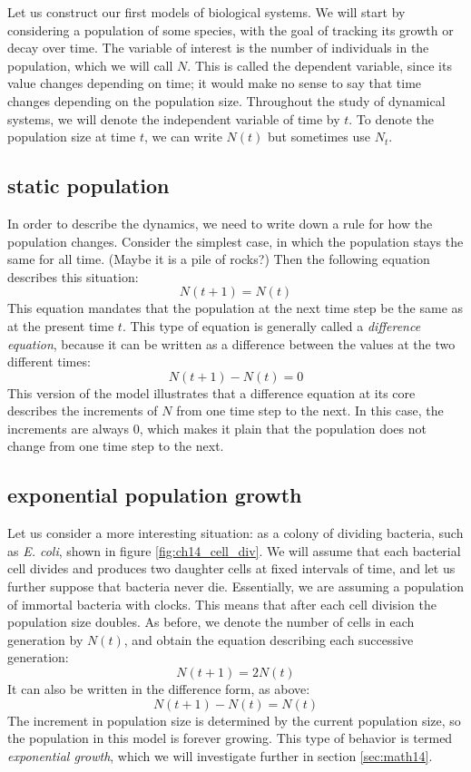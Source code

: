 \documentclass[
  letterpaper,
  DIV=11,
  numbers=noendperiod]{scrreprt}
\begin{document}
Let us construct our first models of biological systems. We will start
by considering a population of some species, with the goal of tracking
its growth or decay over time. The variable of interest is the number of
individuals in the population, which we will call \(N\). This is called
the  dependent variable, since its value
changes depending on time; it would make no sense to say that time
changes depending on the population size. Throughout the study of
dynamical systems, we will denote the 
independent variable of time by \(t\). To denote the population size at
time \(t\), we can write \(N(t)\) but sometimes use \(N_t\).

\hypertarget{static-population}{%
\subsection{static population}\label{static-population}}

In order to describe the dynamics, we need to write down a rule for how
the population changes. Consider the simplest case, in which the
population stays the same for all time. (Maybe it is a pile of rocks?)
Then the following equation describes this situation: \[N(t+1) = N(t) \]
This equation mandates that the population at the next time step be the
same as at the present time \(t\). This type of equation is generally
called a  \emph{difference
equation}, because it can be written as a difference between the values
at the two different times: \[N(t+1) - N(t) = 0\] This version of the
model illustrates that a difference equation at its core describes the
increments of \(N\) from one time step to the next. In this case, the
increments are always 0, which makes it plain that the population does
not change from one time step to the next.

\hypertarget{exponential-population-growth}{%
\subsection{exponential population
growth}\label{exponential-population-growth}}

Let us consider a more interesting situation: as a colony of dividing
bacteria, such as \emph{E. coli}, shown in figure
\ref{fig:ch14_cell_div}. We will assume that each bacterial cell divides
and produces two daughter cells at fixed intervals of time, and let us
further suppose that bacteria never die. Essentially, we are assuming a
population of immortal bacteria with clocks.
This means that after each cell division the
population size doubles. As before, we denote the number of cells in
each generation by \(N(t)\), and obtain the equation describing each
successive generation: \[ N(t+1) = 2N(t)\] It can also be written in the
difference form, as above: \[ N(t+1) - N(t) = N(t) \] The increment in
population size is determined by the current population size, so the
population in this model is forever growing. This type of behavior is
termed  
\emph{exponential growth}, which we will investigate further in section
\ref{sec:math14}.
\end{document}
